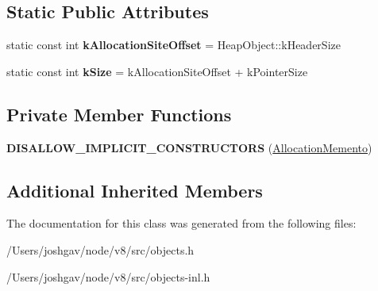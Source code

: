 \subsection*{Static Public Attributes}
\begin{DoxyCompactItemize}
\item 
static const int {\bfseries k\+Allocation\+Site\+Offset} = Heap\+Object\+::k\+Header\+Size\hypertarget{classv8_1_1internal_1_1_allocation_memento_ab07187e61f49dfb2c298a49b5aea49d7}{}\label{classv8_1_1internal_1_1_allocation_memento_ab07187e61f49dfb2c298a49b5aea49d7}

\item 
static const int {\bfseries k\+Size} = k\+Allocation\+Site\+Offset + k\+Pointer\+Size\hypertarget{classv8_1_1internal_1_1_allocation_memento_acf92166b75198263c67253249c64edf1}{}\label{classv8_1_1internal_1_1_allocation_memento_acf92166b75198263c67253249c64edf1}

\end{DoxyCompactItemize}
\subsection*{Private Member Functions}
\begin{DoxyCompactItemize}
\item 
{\bfseries D\+I\+S\+A\+L\+L\+O\+W\+\_\+\+I\+M\+P\+L\+I\+C\+I\+T\+\_\+\+C\+O\+N\+S\+T\+R\+U\+C\+T\+O\+RS} (\hyperlink{classv8_1_1internal_1_1_allocation_memento}{Allocation\+Memento})\hypertarget{classv8_1_1internal_1_1_allocation_memento_ae63138efc64a1f100fa781887f64ebd2}{}\label{classv8_1_1internal_1_1_allocation_memento_ae63138efc64a1f100fa781887f64ebd2}

\end{DoxyCompactItemize}
\subsection*{Additional Inherited Members}


The documentation for this class was generated from the following files\+:\begin{DoxyCompactItemize}
\item 
/\+Users/joshgav/node/v8/src/objects.\+h\item 
/\+Users/joshgav/node/v8/src/objects-\/inl.\+h\end{DoxyCompactItemize}
